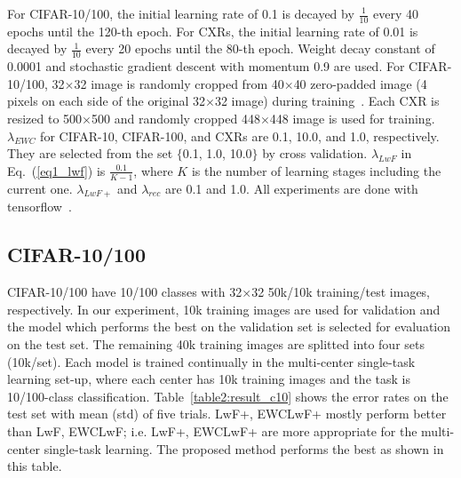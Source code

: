 \documentclass[runningheads,a4paper]{llncs}
\begin{document}
For CIFAR-10/100, the initial learning rate of 0.1 is decayed by $\frac{1}{10}$ every 40 epochs until the 120-th epoch. For CXRs, the initial learning rate of 0.01 is decayed by $\frac{1}{10}$ every 20 epochs until the 80-th epoch. Weight decay constant of 0.0001 and stochastic gradient descent with momentum 0.9 are used. For CIFAR-10/100, 32$\times$32 image is randomly cropped from 40$\times$40 zero-padded image (4 pixels on each side of the original 32$\times$32 image) during training~\cite{r07_resnet_cvpr2016}. Each CXR is resized to 500$\times$500 and randomly cropped 448$\times$448 image is used for training. $\lambda_{EWC}$ for CIFAR-10, CIFAR-100, and CXRs are 0.1, 10.0, and 1.0, respectively. They are selected from the set $\{$0.1, 1.0, 10.0$\}$ by cross validation. $\lambda_{LwF}$ in Eq.~(\ref{eq1_lwf}) is $\frac{0.1}{K-1}$, where $K$ is the number of learning stages including the current one. $\lambda_{LwF+}$ and $\lambda_{rec}$ are 0.1 and 1.0. All experiments are done with tensorflow~\cite{r16_tf}.

\subsection{CIFAR-10/100}

CIFAR-10/100 have 10/100 classes with 32$\times$32 50k/10k training/test images, respectively. In our experiment, 10k training images are used for validation and the model which performs the best on the validation set is selected for evaluation on the test set. The remaining 40k training images are splitted into four sets (10k/set). Each model is trained continually in the multi-center single-task learning set-up, where each center has 10k training images and the task is 10/100-class classification. Table~\ref{table2:result_c10} shows the error rates on the test set with mean (std) of five trials. LwF+, EWCLwF+ mostly perform better than LwF, EWCLwF; i.e. LwF+, EWCLwF+ are more appropriate for the multi-center single-task learning. The proposed method performs the best as shown in this table. 
\end{document}
